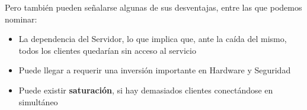 \documentclass[11pt]{article}
\begin{document}
Pero también pueden señalarse algunas de sus desventajas, entre las que podemos 
nominar:
\begin{itemize}
    \item La dependencia del Servidor, lo que implica que, ante la caída del 
    mismo, todos los clientes quedarían sin acceso al servicio 
    
    \item Puede llegar a requerir una inversión importante en Hardware y 
    Seguridad 
    
    \item Puede existir \textbf{saturación}, si hay demasiados clientes 
    conectándose en simultáneo
\end{itemize}
\end{document}
